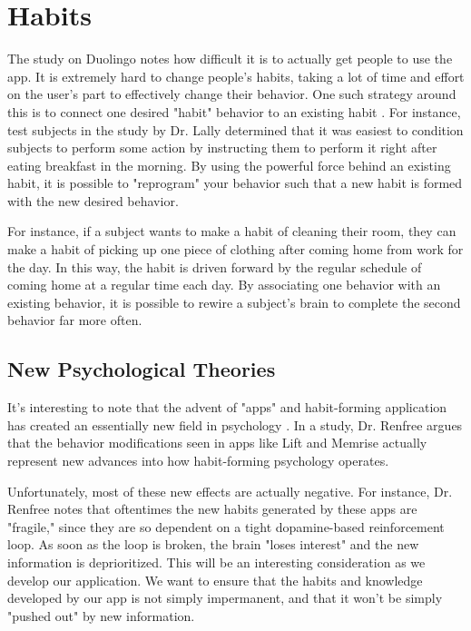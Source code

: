 \section{Habits}
The study on Duolingo notes how difficult it is to actually get people to use the app. It is extremely hard to change people's habits, taking a lot of time and effort on the user's part to effectively change their behavior. One such strategy around this is to connect one desired "habit" behavior to an existing habit \cite{lally2010habits}. For instance, test subjects in the study by Dr. Lally determined that it was easiest to condition subjects to perform some action by instructing them to perform it right after eating breakfast in the morning. By using the powerful force behind an existing habit, it is possible to "reprogram" your behavior such that a new habit is formed with the new desired behavior.

For instance, if a subject wants to make a habit of cleaning their room, they can make a habit of picking up one piece of clothing after coming home from work for the day. In this way, the habit is driven forward by the regular schedule of coming home at a regular time each day. By associating one behavior with an existing behavior, it is possible to rewire a subject's brain to complete the second behavior far more often.

\subsection{New Psychological Theories}
It's interesting to note that the advent of "apps" and habit-forming application has created an essentially new field in psychology \cite{renfree2016don}. In a study, Dr. Renfree argues that the behavior modifications seen in apps like Lift and Memrise actually represent new advances into how habit-forming psychology operates.

Unfortunately, most of these new effects are actually negative. For instance, Dr. Renfree notes that oftentimes the new habits generated by these apps are "fragile," since they are so dependent on a tight dopamine-based reinforcement loop. As soon as the loop is broken, the brain "loses interest" and the new 
information is deprioritized. This will be an interesting consideration as we develop our application. We want to ensure that the habits and knowledge developed by our app is not simply impermanent, and that it won't be simply "pushed out" by new information.